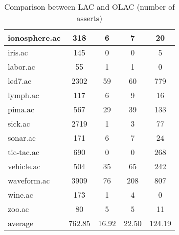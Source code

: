 \begin{table}[htbp]
\begin{tabular}{|l|c|c|c|c|}
		\hline
		ionosphere.ac   & 318           & 6                  & 7                        & 20                            \\
		\hline
		iris.ac         & 145           & 0                  & 0                        & 5                             \\
		\hline
		labor.ac        & 55            & 1                  & 1                        & 0                             \\
		\hline
		led7.ac         & 2302          & 59                 & 60                       & 779                           \\
		\hline
		lymph.ac        & 117           & 6                  & 9                        & 16                            \\
		\hline
		pima.ac         & 567           & 29                 & 39                       & 133                           \\
		\hline
		sick.ac         & 2719          & 1                  & 3                        & 77                            \\
		\hline
		sonar.ac        & 171           & 6                  & 7                        & 24                            \\
		\hline
		tic-tac.ac      & 690           & 0                  & 0                        & 268                           \\
		\hline
		vehicle.ac      & 504           & 35                 & 65                       & 242                           \\
		\hline
		waveform.ac     & 3909          & 76                 & 208                      & 807                           \\
		\hline
		wine.ac         & 173           & 1                  & 4                        & 0                             \\
		\hline
		zoo.ac          & 80            & 5                  & 5                        & 11                            \\
		\hline
		average         & 762.85        & 16.92              & 22.50                    & 124.19                        \\
		\hline
		\end{tabular}
	\caption{Comparison between LAC and OLAC (number of asserts)}
	\label{tab:comparison_lac_olac}
\end{table}